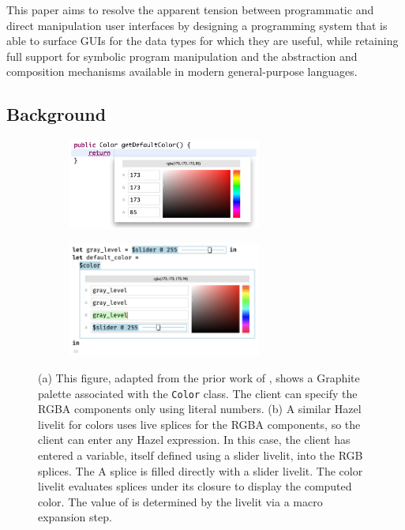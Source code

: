 This paper aims to resolve the apparent tension between
programmatic and direct manipulation user interfaces by designing a programming system that
is able to surface GUIs for the data types for which
they are useful, while retaining full support for symbolic program manipulation
and the abstraction and composition mechanisms
available in modern general-purpose languages.

\subsection{Background}
\begin{figure}
  \begin{center}
    \begin{subfigure}[t]{0.5\textwidth}
      \centering
      \vspace{-3.4cm}
      \includegraphics[width=15pc]{graphite-color-palette.png}
    \end{subfigure}\begin{subfigure}[t]{0.5\textwidth}
      \centering
      \includegraphics[width=15pc]{slider-color-livelits.png}
    \end{subfigure}
  \end{center}
  \caption{
  (a) This figure, adapted from the prior work of \citet{Graphite},
  shows a Graphite palette associated with the \texttt{Color} class.
  The client can specify the RGBA components only using literal numbers.
  (b) A similar Hazel livelit for colors uses live splices for the RGBA components,
  so the client can enter any Hazel expression.
  In this case, the client has entered a variable, itself defined using a slider livelit, into the RGB
  splices. The A splice is filled directly with a slider livelit.
  The color livelit evaluates splices under its closure to display the
  computed color.
  The value of  is determined by the livelit via a macro expansion step.}
  \label{fig:color}
\end{figure}


